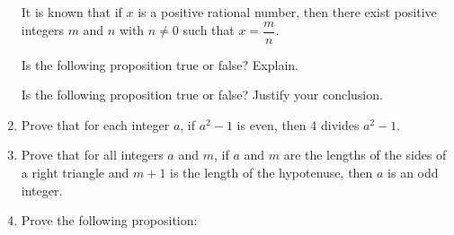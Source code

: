 \begin{enumerate}
It is known that if  $x$  is a positive rational number, then there exist positive integers  $m$  and  $n$ with  $n \ne 0$ such that  $x = \dfrac{m}{n}$.

Is the following proposition true or false?  Explain.

\label{exer:sec32-rational}%

\xitem Is the following proposition true or false?  Justify your conclusion.
\label{exer:sec32-8}%



\item Prove that for each integer $a$, if $a^2 - 1$ is even, then 4 divides $a^2 - 1$.

\item Prove that for all integers $a$ and $m$, if $a$ and $m$ are the lengths of the sides of a right triangle and $m + 1$ is the length of the hypotenuse, then $a$ is an odd integer.

\item Prove the following proposition:
\label{exer:rationalbetween}%



\end{enumerate}
